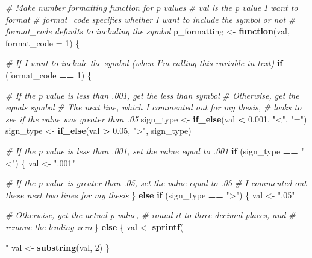 \documentclass[
]{book}
\newenvironment{Shaded}{\begin{snugshade}}{\end{snugshade}}
\newcommand{\CommentTok}[1]{\textcolor[rgb]{0.56,0.35,0.01}{\textit{#1}}}
\newcommand{\ControlFlowTok}[1]{\textcolor[rgb]{0.13,0.29,0.53}{\textbf{#1}}}
\newcommand{\DataTypeTok}[1]{\textcolor[rgb]{0.13,0.29,0.53}{#1}}
\newcommand{\DecValTok}[1]{\textcolor[rgb]{0.00,0.00,0.81}{#1}}
\newcommand{\FloatTok}[1]{\textcolor[rgb]{0.00,0.00,0.81}{#1}}
\newcommand{\KeywordTok}[1]{\textcolor[rgb]{0.13,0.29,0.53}{\textbf{#1}}}
\newcommand{\NormalTok}[1]{#1}
\newcommand{\OperatorTok}[1]{\textcolor[rgb]{0.81,0.36,0.00}{\textbf{#1}}}
\newcommand{\StringTok}[1]{\textcolor[rgb]{0.31,0.60,0.02}{#1}}
\begin{document}
\begin{Shaded}
\begin{Highlighting}[]
\CommentTok{# Make number formatting function for p values}
\CommentTok{# val is the p value I want to format}
\CommentTok{# format_code specifies whether I want to include the symbol or not}
  \CommentTok{# format_code defaults to including the symbol}
\NormalTok{p_formatting <-}\StringTok{ }\ControlFlowTok{function}\NormalTok{(val, }\DataTypeTok{format_code =} \DecValTok{1}\NormalTok{) \{}
  
  \CommentTok{# If I want to include the symbol (when I'm calling this variable in text)}
  \ControlFlowTok{if}\NormalTok{ (format_code }\OperatorTok{==}\StringTok{ }\DecValTok{1}\NormalTok{) \{}
    
    \CommentTok{# If the p value is less than .001, get the less than symbol}
      \CommentTok{# Otherwise, get the equals symbol}
      \CommentTok{# The next line, which I commented out for my thesis,}
      \CommentTok{# looks to see if the value was greater than .05}
\NormalTok{    sign_type <-}\StringTok{ }\KeywordTok{if_else}\NormalTok{(val }\OperatorTok{<}\StringTok{ }\FloatTok{0.001}\NormalTok{, }\StringTok{"<"}\NormalTok{, }\StringTok{"="}\NormalTok{)}
\NormalTok{    sign_type <-}\StringTok{ }\KeywordTok{if_else}\NormalTok{(val }\OperatorTok{>}\StringTok{ }\FloatTok{0.05}\NormalTok{, }\StringTok{">"}\NormalTok{, sign_type)}
    
    \CommentTok{# If the p value is less than .001, set the value equal to .001}
    \ControlFlowTok{if}\NormalTok{ (sign_type }\OperatorTok{==}\StringTok{ "<"}\NormalTok{) \{}
\NormalTok{      val <-}\StringTok{ ".001"}
      
    \CommentTok{# If the p value is greater than .05, set the value equal to .05 }
      \CommentTok{# I commented out these next two lines for my thesis}
\NormalTok{    \} }\ControlFlowTok{else} \ControlFlowTok{if}\NormalTok{ (sign_type }\OperatorTok{==}\StringTok{ ">"}\NormalTok{) \{}
\NormalTok{      val <-}\StringTok{ ".05"}
      
    \CommentTok{# Otherwise, get the actual p value,}
      \CommentTok{# round it to three decimal places, and}
      \CommentTok{# remove the leading zero}
\NormalTok{    \} }\ControlFlowTok{else}\NormalTok{ \{}
\NormalTok{      val <-}\StringTok{ }\KeywordTok{sprintf}\NormalTok{(}\StringTok{"%
\NormalTok{      val <-}\StringTok{ }\KeywordTok{substring}\NormalTok{(val, }\DecValTok{2}\NormalTok{)}
\NormalTok{    \}}
    
}
\end{Highlighting}
\end{Shaded}
\end{document}
